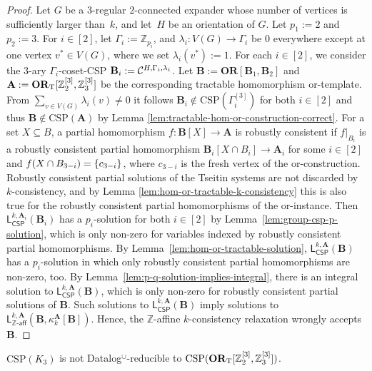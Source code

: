 \documentclass[a4paper,english, thm-restate]{lipics-v2021}
\newcommand{\ZZ}{\mathbb{Z}}
\DeclarePairedDelimiter\set{\lbrace}{\rbrace}
\newcommand{\StructA}{\mathbf{A}}
\newcommand{\StructB}{\mathbf{B}}
\newcommand{\CSP}[1]{\mathrm{CSP}(#1)}
\newcommand{\restrict}[2]{#1|_{#2}}
\newcommand{\leqs}{\mathsf{L}}
\newcommand{\cspiso}[3]{\leqs^{#1,#2}_{\mathsf{CSP}}(#3)}
\newcommand{\zafkleq}[4]{\leqs^{#1,#2}_{\ZZ\mathsf{\text{-}aff}}(#3,#4)}
\newcommand{\CosetGrpTmplt}[2]{#1^{[#2]}}
\newcommand{\OR}[1]{\mathbf{OR}[#1]}
\begin{document}
	\begin{proof}
		Let $G$ be a $3$\nobreakdash-regular $2$\nobreakdash-connected expander whose number of vertices is sufficiently larger than~$k$, and let~$H$ be an orientation of $G$.
		Let $p_1 := 2$ and $p_2 := 3$. For $i \in [2]$, let $\Gamma_i := \ZZ_{p_i}$, and ${\lambda_i: V(G) \to \Gamma_i}$ be $0$ everywhere except at one vertex $v^* \in V(G)$, where we set $\lambda_i(v^*) := 1$.
		For each $i \in [2]$, we consider the $3$-ary $\Gamma_i$-coset-CSP $\StructB_i := \grpCSP{H}{\Gamma_i}{\lambda_i}$. 
		Let $\StructB := \OR{\StructB_1,\StructB_2} $ and $\StructA := \ZtwoOrThreeInst$ be the corresponding
		tractable homomorphism or-template.
		From $\sum_{v\in V(G)} \lambda_i(v) \neq 0$
		it follows $\StructB_i\notin\CSP{\CosetGrpTmplt{\Gamma_i}{3}}$ for both $i \in [2]$ and thus $\StructB\notin \CSP{\StructA}$  by Lemma \ref{lem:tractable-hom-or-construction-correct}.
		For a set $X\subseteq B$, a partial homomorphism  $f\colon\StructB[X] \to\StructA$ is robustly consistent
		if $\restrict{f}{B_i}$
		is a robustly consistent partial homomorphism $\StructB_i[X\cap B_i] \to \StructA_i$ for some $i \in [2]$
		and $f(X\cap B_{3-i}) = \set{c_{3-i}}$, where $c_{3-i}$ is the fresh vertex of the or-construction.
		Robustly consistent partial solutions of the Tseitin systems 
		are not discarded by $k$-consistency, and by Lemma \ref{lem:hom-or-tractable-k-consistency} this is also true for the   robustly consistent partial homomorphisms of the or-instance.
Then $\cspiso{k}{\StructA_i}{\StructB_i}$ has a $p_i$-solution for both $i\in[2]$ by Lemma~\ref{lem:group-csp-p-solution},
		which is only non-zero for variables indexed by robustly consistent partial homomorphisms.
		By Lemma~\ref{lem:hom-or-tractable-solution}, $\cspiso{k}{\StructA}{\StructB}$ has a $p_i$-solution in which only robustly consistent partial homomorphisms are non-zero, too.
		By Lemma~\ref{lem:p-q-solution-implies-integral},
		there is an integral solution to $\cspiso{k}{\StructA}{\StructB}$,
		which is only non-zero for robustly consistent partial solutions of $\StructB$.
		Such solutions to $\cspiso{k}{\StructA}{\StructB}$
		imply solutions to $\zafkleq{k}{\StructA}{\StructB}{\kappa_k^{\StructA}[\StructB]}$.
		Hence, the $\ZZ$-affine $k$-consistency relaxation wrongly accepts $\StructB$.
	\end{proof}
\begin{lemma}[restate=notDatalogReducible, name =]
		\label{lem:not-datalog-reducible}
		$\CSP{K_3}$ is not Datalog$^\cup$-reducible to $\CSP{\ZtwoOrThreeInst}$.
	\end{lemma}
\end{document}
